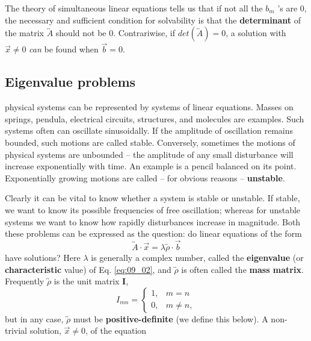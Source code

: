 The theory of simultaneous linear equations tells us that if not all
the $b_m$ 's are 0, the necessary and sufficient condition for solvability is that the \textbf{
    determinant} of the matrix $\overleftrightarrow{A}$ should not be 0.
Contrariwise, if $det(\overleftrightarrow{A} )= 0$, a solution with $\vec{x} \neq 0 $ \textit{can} be found
when $\vec{b}= 0$.

\subsection{Eigenvalue problems} 
 physical systems can be represented by systems of linear 
equations. Masses on springs, pendula, electrical circuits,
structures, and molecules are examples. Such systems often can
oscillate sinusoidally. If the amplitude of oscillation remains
bounded, such motions are called stable. Conversely, sometimes
the motions of physical systems are unbounded -- the amplitude
of any small disturbance will increase exponentially with time. An
example is a pencil balanced on its point. Exponentially growing
motions are called -- for obvious reasons -- \textbf{unstable}.

Clearly it can be vital to know whether a system is stable or
unstable. If stable, we want to know its possible frequencies of
free oscillation; whereas for unstable systems we want to know
how rapidly disturbances increase in magnitude. Both these
problems can be expressed as the question: do linear equations
of the form
\begin{equation}
    \overleftrightarrow{A} \cdot \vec{x} = \lambda \overleftrightarrow{\rho} \cdot \vec{b} \label{eq:09_02}
\end{equation}
have solutions? Here $\lambda$ is generally a complex number, called the
\textbf{eigenvalue} (or \textbf{characteristic} value) of Eq. \ref{eq:09_02}, and $\overleftrightarrow{\rho}$ is often called
the \textbf{mass matrix}. Frequently $\overleftrightarrow{\rho}$ is the unit matrix \textbf{I},
\begin{equation}
I_{mn}=
\begin{cases}
     1, & m = n\\
     0, & m \neq n,
    \end{cases}
    \label{eq:09_03}
\end{equation}
but in any case, $\overleftrightarrow{\rho}$ must be \textbf{positive-definite} (we define this
below). A non-trivial solution, $\vec{x} \neq 0$, of the equation

